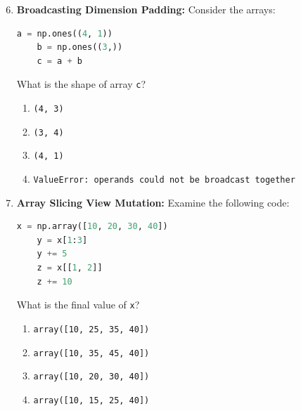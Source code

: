 \begin{enumerate}
    \setcounter{enumi}{5}
    \item \textbf{Broadcasting Dimension Padding:}
    Consider the arrays:
    \begin{lstlisting}[language=Python]
    a = np.ones((4, 1))
    b = np.ones((3,))
    c = a + b
    \end{lstlisting}
    What is the shape of array \texttt{c}?
    \begin{enumerate}
        \item \texttt{(4, 3)}
        \item \texttt{(3, 4)}
        \item \texttt{(4, 1)}
        \item \texttt{ValueError: operands could not be broadcast together}
    \end{enumerate}

    \item \textbf{Array Slicing View Mutation:}
    Examine the following code:
    \begin{lstlisting}[language=Python]
    x = np.array([10, 20, 30, 40])
    y = x[1:3]
    y += 5
    z = x[[1, 2]]
    z += 10
    \end{lstlisting}
    What is the final value of \texttt{x}?
    \begin{enumerate}
        \item \texttt{array([10, 25, 35, 40])}
        \item \texttt{array([10, 35, 45, 40])}
        \item \texttt{array([10, 20, 30, 40])}
        \item \texttt{array([10, 15, 25, 40])}
    \end{enumerate}
\end{enumerate}
